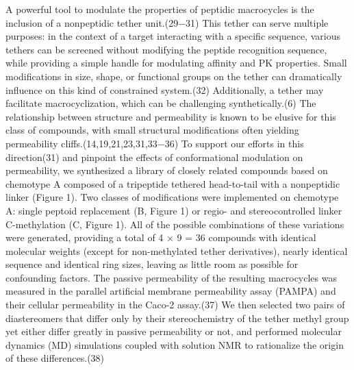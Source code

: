 A powerful tool to modulate the properties of peptidic macrocycles is the inclusion of a nonpeptidic tether unit.(29−31) This tether can serve multiple purposes: in the context of a target interacting with a specific sequence, various tethers can be screened without modifying the peptide recognition sequence, while providing a simple handle for modulating affinity and PK properties. Small modifications in size, shape, or functional groups on the tether can dramatically influence on this kind of constrained system.(32) Additionally, a tether may facilitate macrocyclization, which can be challenging synthetically.(6) The relationship between structure and permeability is known to be elusive for this class of compounds, with small structural modifications often yielding permeability cliffs.(14,19,21,23,31,33−36)
To support our efforts in this direction(31) and pinpoint the effects of conformational modulation on permeability, we synthesized a library of closely related compounds based on chemotype A composed of a tripeptide tethered head-to-tail with a nonpeptidic linker (Figure 1). Two classes of modifications were implemented on chemotype A: single peptoid replacement (B, Figure 1) or regio- and stereocontrolled linker C-methylation (C, Figure 1). All of the possible combinations of these variations were generated, providing a total of 4 × 9 = 36 compounds with identical molecular weights (except for non-methylated tether derivatives), nearly identical sequence and identical ring sizes, leaving as little room as possible for confounding factors. The passive permeability of the resulting macrocycles was measured in the parallel artificial membrane permeability assay (PAMPA) and their cellular permeability in the Caco-2 assay.(37) We then selected two pairs of diastereomers that differ only by their stereochemistry of the tether methyl group yet either differ greatly in passive permeability or not, and performed molecular dynamics (MD) simulations coupled with solution NMR to rationalize the origin of these differences.(38)
